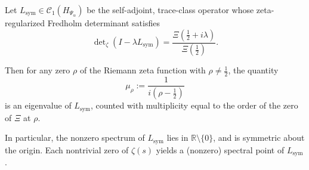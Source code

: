 \begin{lemma}
\label{lem:zero_to_spectrum_correspondence}
Let \( L_{\mathrm{sym}} \in \mathcal{C}_1(H_{\Psi_\alpha}) \) be the self-adjoint, trace-class operator whose zeta-regularized Fredholm determinant satisfies
\[
\det\nolimits_\zeta(I - \lambda L_{\mathrm{sym}}) = \frac{\Xi\left( \tfrac{1}{2} + i\lambda \right)}{\Xi\left( \tfrac{1}{2} \right)}.
\]

Then for any zero \( \rho \) of the Riemann zeta function with \( \rho \ne \tfrac{1}{2} \), the quantity
\[
\mu_\rho := \frac{1}{i(\rho - \tfrac{1}{2})}
\]
is an eigenvalue of \( L_{\mathrm{sym}} \), counted with multiplicity equal to the order of the zero of \( \Xi \) at \( \rho \).

\medskip
\noindent
In particular, the nonzero spectrum of \( L_{\mathrm{sym}} \) lies in \( \mathbb{R} \setminus \{0\} \), and is symmetric about the origin. Each nontrivial zero of \( \zeta(s) \) yields a (nonzero) spectral point of \( L_{\mathrm{sym}} \).
\end{lemma}
% 
